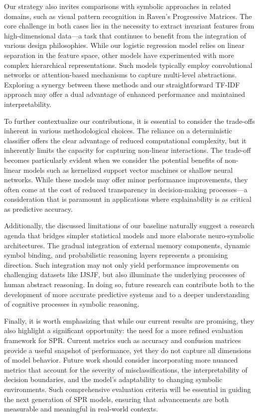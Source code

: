 \documentclass{article}
\begin{document}
Our strategy also invites comparisons with symbolic approaches in related domains, such as visual pattern recognition in Raven’s Progressive Matrices. The core challenge in both cases lies in the necessity to extract invariant features from high-dimensional data—a task that continues to benefit from the integration of various design philosophies. While our logistic regression model relies on linear separation in the feature space, other models have experimented with more complex hierarchical representations. Such models typically employ convolutional networks or attention-based mechanisms to capture multi-level abstractions. Exploring a synergy between these methods and our straightforward TF-IDF approach may offer a dual advantage of enhanced performance and maintained interpretability.

To further contextualize our contributions, it is essential to consider the trade-offs inherent in various methodological choices. The reliance on a deterministic classifier offers the clear advantage of reduced computational complexity, but it inherently limits the capacity for capturing non-linear interactions. The trade-off becomes particularly evident when we consider the potential benefits of non-linear models such as kernelized support vector machines or shallow neural networks. While these models may offer minor performance improvements, they often come at the cost of reduced transparency in decision-making processes—a consideration that is paramount in applications where explainability is as critical as predictive accuracy.

Additionally, the discussed limitations of our baseline naturally suggest a research agenda that bridges simpler statistical models and more elaborate neuro-symbolic architectures. The gradual integration of external memory components, dynamic symbol binding, and probabilistic reasoning layers represents a promising direction. Such integration may not only yield performance improvements on challenging datasets like IJSJF, but also illuminate the underlying processes of human abstract reasoning. In doing so, future research can contribute both to the development of more accurate predictive systems and to a deeper understanding of cognitive processes in symbolic reasoning.

Finally, it is worth emphasizing that while our current results are promising, they also highlight a significant opportunity: the need for a more refined evaluation framework for SPR. Current metrics such as accuracy and confusion matrices provide a useful snapshot of performance, yet they do not capture all dimensions of model behavior. Future work should consider incorporating more nuanced metrics that account for the severity of misclassifications, the interpretability of decision boundaries, and the model’s adaptability to changing symbolic environments. Such comprehensive evaluation criteria will be essential in guiding the next generation of SPR models, ensuring that advancements are both measurable and meaningful in real-world contexts.
\end{document}
